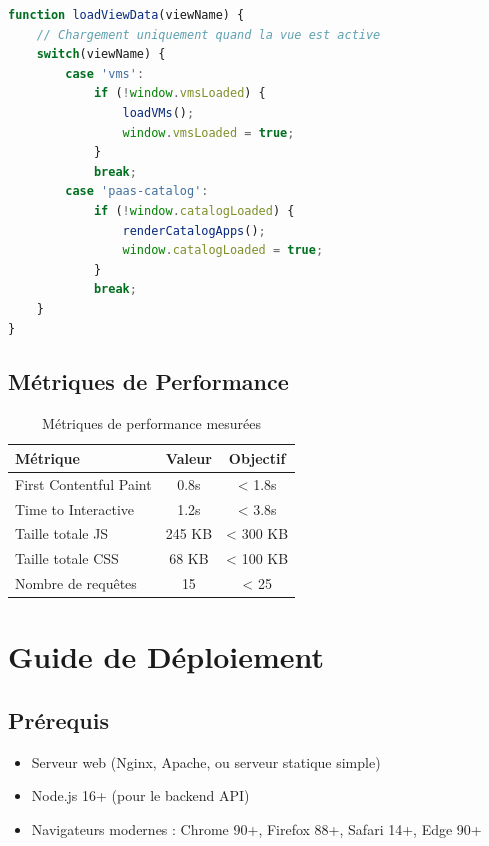 \documentclass[12pt,a4paper]{article}
\begin{document}
\begin{lstlisting}[language=JavaScript,caption=Chargement à la demande]
function loadViewData(viewName) {
    // Chargement uniquement quand la vue est active
    switch(viewName) {
        case 'vms':
            if (!window.vmsLoaded) {
                loadVMs();
                window.vmsLoaded = true;
            }
            break;
        case 'paas-catalog':
            if (!window.catalogLoaded) {
                renderCatalogApps();
                window.catalogLoaded = true;
            }
            break;
    }
}
\end{lstlisting}

\subsection{Métriques de Performance}

\begin{table}[H]
\centering
\begin{tabular}{lcc}
\toprule
\textbf{Métrique} & \textbf{Valeur} & \textbf{Objectif} \\
\midrule
First Contentful Paint & 0.8s & < 1.8s \\
Time to Interactive & 1.2s & < 3.8s \\
Taille totale JS & 245 KB & < 300 KB \\
Taille totale CSS & 68 KB & < 100 KB \\
Nombre de requêtes & 15 & < 25 \\
\bottomrule
\end{tabular}
\caption{Métriques de performance mesurées}
\end{table}

\section{Guide de Déploiement}

\subsection{Prérequis}

\begin{infobox}
\begin{itemize}
    \item Serveur web (Nginx, Apache, ou serveur statique simple)
    \item Node.js 16+ (pour le backend API)
    \item Navigateurs modernes : Chrome 90+, Firefox 88+, Safari 14+, Edge 90+
\end{itemize}
\end{infobox}
\end{document}
